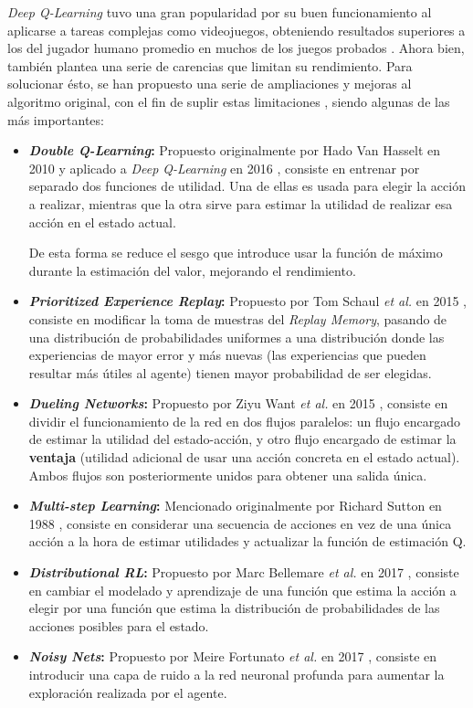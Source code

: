 \textit{Deep Q-Learning} tuvo una gran popularidad por su buen funcionamiento al aplicarse a tareas complejas como videojuegos, obteniendo resultados superiores a los del jugador humano promedio en muchos de los juegos probados \cite{Mnih2015HumanlevelCT}. Ahora bien, también plantea una serie de carencias que limitan su rendimiento. Para solucionar ésto, se han propuesto una serie de ampliaciones y mejoras al algoritmo original, con el fin de suplir estas limitaciones \cite{DBLP:journals/corr/abs-1710-02298}, siendo algunas de las más importantes:
\begin{itemize}
	\item \textbf{\textit{Double Q-Learning}:} Propuesto originalmente por Hado Van Hasselt en 2010 \cite{doubleqlearning} y aplicado a \textit{Deep Q-Learning} en 2016 \cite{DBLP:journals/corr/HasseltGS15}, consiste en entrenar por separado dos funciones de utilidad. Una de ellas es usada para elegir la acción a realizar, mientras que la otra sirve para estimar la utilidad de realizar esa acción en el estado actual.
	
	De esta forma se reduce el sesgo que introduce usar la función de máximo durante la estimación del valor, mejorando el rendimiento.
	\item \textbf{\textit{Prioritized Experience Replay}:} Propuesto por Tom Schaul \textit{et al.} en 2015 \cite{schaul2015prioritized}, consiste en modificar la toma de muestras del \textit{Replay Memory}, pasando de una distribución de probabilidades uniformes a una distribución donde las experiencias de mayor error y más nuevas (las experiencias que pueden resultar más útiles al agente) tienen mayor probabilidad de ser elegidas.
	\item \textbf{\textit{Dueling Networks}:} Propuesto por Ziyu Want \textit{et al.} en 2015 \cite{DBLP:journals/corr/WangFL15}, consiste en dividir el funcionamiento de la red en dos flujos paralelos: un flujo encargado de estimar la utilidad del estado-acción, y otro flujo encargado de estimar la \textbf{ventaja} (utilidad adicional de usar una acción concreta en el estado actual). Ambos flujos son posteriormente unidos para obtener una salida única.
	\item \textbf{\textit{Multi-step Learning}:} Mencionado originalmente por Richard Sutton en 1988 \cite{10.1023/A:1022633531479}, consiste en considerar una secuencia de acciones en vez de una única acción a la hora de estimar utilidades y actualizar la función de estimación Q.
	\item \textbf{\textit{Distributional RL}:} Propuesto por Marc Bellemare \textit{et al.} en 2017 \cite{DBLP:journals/corr/BellemareDM17}, consiste en cambiar el modelado y aprendizaje de una función que estima la acción a elegir por una función que estima la distribución de probabilidades de las acciones posibles para el estado.
	\item \textbf{\textit{Noisy Nets}:} Propuesto por Meire Fortunato \textit{et al.} en 2017 \cite{DBLP:journals/corr/FortunatoAPMOGM17}, consiste en introducir una capa de ruido a la red neuronal profunda para aumentar la exploración realizada por el agente.
\end{itemize}

